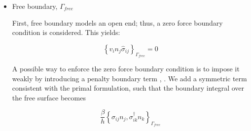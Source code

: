 \begin{itemize}
  \item Free boundary, $\Gamma_{free}$
  
  First, free boundary models an open end; thus, a zero force boundary condition is considered. This yields:
  
  \begin{equation}
  \left\{ v_i n_j \hat{\sigma}_{ij} \right\}_{\Gamma_{free}} = 0
  \end{equation}
  
  
  
  A possible way to enforce the zero force boundary condition  is to impose it weakly by introducing a penalty boundary term \cite{Nitsche1971}, \cite{freund1995weakly}. We add a symmetric term consistent with the primal formulation, such that the boundary integral over the free surface becomes
  
  
  \begin{equation}
  \frac{\beta}{h} \left\{ \sigma_{ij} n_j , \sigma_{ik}^\dagger n_k \right\}_{\Gamma_{free}}
  \end{equation}
  

\end{itemize}
